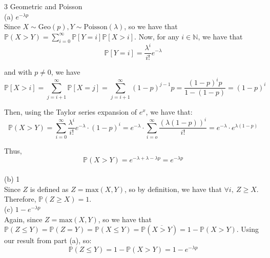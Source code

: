 \documentclass{article}
\begin{document}
{\Large 3 Geometric and Poisson} \\[.5cm]
{\color{red} (a) $e^{-\lambda p}$} \\

Since $X\sim\text{Geo}(p), Y\sim\text{Poisson}(\lambda)$, so we have that
$\mathbb{P}(X>Y) = 
\sum\limits_{i=0}^\infty \mathbb{P}[Y=i]\mathbb{P}[X>i]$.
Now, for any $i\in\mathbb{N}$, we have that
$$\mathbb{P}[Y=i] = \frac{\lambda^i}{i!}e^{-\lambda}$$

and with $p\neq 0$, we have 
$$\mathbb{P}[X>i] = \sum\limits_{j=i+1}^\infty \mathbb{P}[X=j] =
\sum\limits_{j=i+1}^\infty (1-p)^{j-1}p =
\frac{(1-p)^i p}{1-(1-p)} = (1-p)^i$$

Then, using the Taylor series expansion of $e^x$, we have that:
$$\mathbb{P}(X>Y) = \sum\limits_{i=0}^\infty \frac{\lambda^i}{i!}e^{-\lambda} \cdot (1-p)^i =
e^{-\lambda} \cdot \sum\limits_{i=o}^\infty \frac{(\lambda (1-p))^i}{i!} =
e^{-\lambda} \cdot e^{\lambda(1-p)}$$

Thus,
$$\mathbb{P}(X>Y) = e^{-\lambda + \lambda - \lambda p} = e^{-\lambda p}$$ \\[.5cm]
{\color{red} (b) 1} \\

Since $Z$ is defined as $Z = \text{max}(X, Y)$, so by definition, we have that $\forall i,\ Z\geq X$. Therefore,
$\mathbb{P}(Z\geq X) = 1$. \\[1cm]
{\color{red} (c) $1 - e^{-\lambda p}$} \\

Again, since $Z = \text{max}(X, Y)$, so we have that
$\mathbb{P}(Z\leq Y) = \mathbb{P}(Z=Y) = \mathbb{P}(X\leq Y) =
\mathbb{P}(\overline{X>Y}) = 1 - \mathbb{P}(X>Y)$. Using our result from part (a), so:
$$\mathbb{P}(Z\leq Y) = 1 - \mathbb{P}(X>Y) = 1 - e^{-\lambda p}$$
\end{document}
